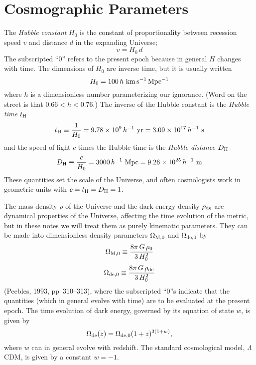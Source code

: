 \documentclass[modern]{aastex62}
\begin{document}
\section{Cosmographic Parameters} \label{sec:param}
The {\em Hubble constant\/} $H_0$ is the constant of proportionality between
recession speed $v$ and distance $d$ in the expanding Universe;
\begin{equation}
v=H_0\, d
\end{equation}
The subscripted ``0'' refers to the present epoch because in general $H$
changes with time.  The dimensions of $H_0$ are inverse time, but it is
usually written
\begin{equation}
H_0=100\,h~{\rm km\,s^{-1}\,Mpc^{-1}}
\end{equation}
where $h$ is a dimensionless number parameterizing our ignorance. (Word on the
street is that $0.66<h<0.76$.)  The inverse of the Hubble constant is the {\em
Hubble time\/} $t_{\rm H}$
\begin{equation}
\label{eq:th}
t_{\rm H}\equiv\frac{1}{H_0}
= 9.78\times10^9\,h^{-1}~{\rm yr}= 3.09\times10^{17}\,h^{-1}~{\rm s}
\end{equation}
and the speed of light $c$ times the Hubble time is the {\em Hubble
distance\/} $D_{\rm H}$
\begin{equation}
\label{eq:dh}
D_{\rm H}\equiv\frac{c}{H_0}
= 3000\,h^{-1}~{\rm Mpc}= 9.26\times10^{25}\,h^{-1}~{\rm m}
\end{equation}
These quantities set the scale of the Universe, and often cosmologists
work in geometric units with $c=t_{\rm H}=D_{\rm H}=1$.

The mass density $\rho$ of the Universe and the dark energy density $\rho_{\rm
de}$ are dynamical properties of the Universe, affecting the time evolution of
the metric, but in these notes we will treat them as purely kinematic
parameters. They can be made into dimensionless density parameters
$\Omega_{{\rm M}, 0}$ and $\Omega_{{\rm de}, 0}$ by
\begin{equation}
\Omega_{{\rm M}, 0}\equiv\frac{8\pi\,G\,\rho_0}{3\,H_0^2}
\end{equation}
\begin{equation}
\Omega_{{\rm de}, 0}\equiv\frac{8\pi\,G\,\rho_{\rm de}}{3\,H_0^2}
\end{equation}
(Peebles, 1993, pp~310--313), where the subscripted ``0''s indicate that the
quantities (which in general evolve with  time) are to be evaluated at the
present epoch. The time evolution of dark energy, governed by its equation of
state $w$, is given by
\begin{equation}
\Omega_{\rm de}(z) = \Omega_{{\rm de}, 0} (1+z)^{3(1+w)}\text{,}
\end{equation}
where $w$ can in general evolve with redshift. The standard cosmological
model, $\Lambda$CDM, is given by a constant $w=-1$.
\end{document}
